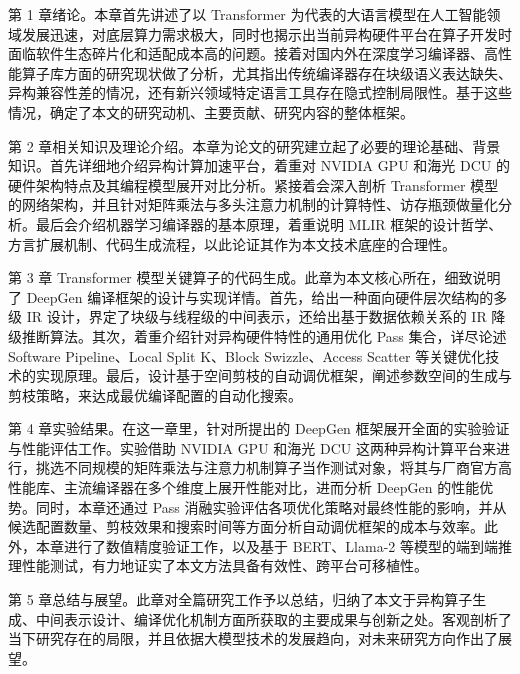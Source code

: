 第 1 章绪论。本章首先讲述了以 Transformer 为代表的大语言模型在人工智能领域发展迅速，对底层算力需求极大，同时也揭示出当前异构硬件平台在算子开发时面临软件生态碎片化和适配成本高的问题。接着对国内外在深度学习编译器、高性能算子库方面的研究现状做了分析，尤其指出传统编译器存在块级语义表达缺失、异构兼容性差的情况，还有新兴领域特定语言工具存在隐式控制局限性。基于这些情况，确定了本文的研究动机、主要贡献、研究内容的整体框架。

第 2 章相关知识及理论介绍。本章为论文的研究建立起了必要的理论基础、背景知识。首先详细地介绍异构计算加速平台，着重对 NVIDIA GPU 和海光 DCU 的硬件架构特点及其编程模型展开对比分析。紧接着会深入剖析 Transformer 模型的网络架构，并且针对矩阵乘法与多头注意力机制的计算特性、访存瓶颈做量化分析。最后会介绍机器学习编译器的基本原理，着重说明 MLIR 框架的设计哲学、方言扩展机制、代码生成流程，以此论证其作为本文技术底座的合理性。

第 3 章 Transformer 模型关键算子的代码生成。此章为本文核心所在，细致说明了 DeepGen 编译框架的设计与实现详情。首先，给出一种面向硬件层次结构的多级 IR 设计，界定了块级与线程级的中间表示，还给出基于数据依赖关系的 IR 降级推断算法。其次，着重介绍针对异构硬件特性的通用优化 Pass 集合，详尽论述 Software Pipeline、Local Split K、Block Swizzle、Access Scatter 等关键优化技术的实现原理。最后，设计基于空间剪枝的自动调优框架，阐述参数空间的生成与剪枝策略，来达成最优编译配置的自动化搜索。

第 4 章实验结果。在这一章里，针对所提出的 DeepGen 框架展开全面的实验验证与性能评估工作。实验借助 NVIDIA GPU 和海光 DCU 这两种异构计算平台来进行，挑选不同规模的矩阵乘法与注意力机制算子当作测试对象，将其与厂商官方高性能库、主流编译器在多个维度上展开性能对比，进而分析 DeepGen 的性能优势。同时，本章还通过 Pass 消融实验评估各项优化策略对最终性能的影响，并从候选配置数量、剪枝效果和搜索时间等方面分析自动调优框架的成本与效率。此外，本章进行了数值精度验证工作，以及基于 BERT、Llama-2 等模型的端到端推理性能测试，有力地证实了本文方法具备有效性、跨平台可移植性。

第 5 章总结与展望。此章对全篇研究工作予以总结，归纳了本文于异构算子生成、中间表示设计、编译优化机制方面所获取的主要成果与创新之处。客观剖析了当下研究存在的局限，并且依据大模型技术的发展趋向，对未来研究方向作出了展望。
